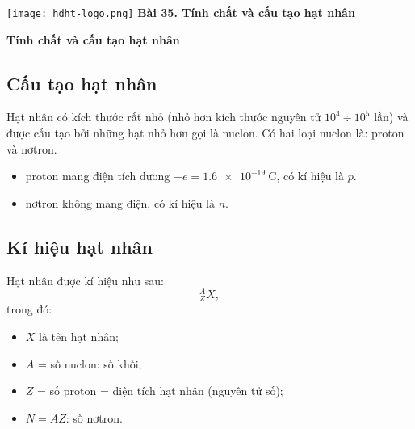 \newcommand{\chapter}[2][]{
	\newcommand{\chapname}{#2}
	\begin{flushleft}
		\begin{minipage}[t]{\linewidth}
			\texttt{[image: hdht-logo.png]}
			\hspace{0pt}	
			\sffamily\bfseries\large Bài 35. Tính chất và cấu tạo hạt nhân
			\begin{flushleft}
				\huge\bfseries #1
			\end{flushleft}
		\end{minipage}
	\end{flushleft}
	\vspace{1cm}
	\normalfont\normalsize
}
\chapter[Tính chất và cấu tạo hạt nhân]{Tính chất và cấu tạo hạt nhân}

\subsection{Cấu tạo hạt nhân}
Hạt nhân có kích thước rất nhỏ (nhỏ hơn kích thước nguyên tử $10^4\div 10^5$ lần) và được cấu tạo bởi những hạt nhỏ hơn gọi là nuclon. Có hai loại nuclon là: proton và nơtron.
\begin{itemize}
	\item proton mang điện tích dương $+e=\SI{1,6e-19}{\coulomb}$, có kí hiệu là $p$.
	\item nơtron không mang điện, có kí hiệu là $n$.
\end{itemize}
\subsection{Kí hiệu hạt nhân}
Hạt nhân được kí hiệu như sau:
\begin{equation}
^A_Z X,
\end{equation}
trong đó:
\begin{itemize}
	\item $X$ là tên hạt nhân;
	\item $A$ = số nuclon: số khối;
	\item $Z$ = số proton = điện tích hạt nhân (nguyên tử số);
	\item $N =A Z$: số nơtron.
\end{itemize}
